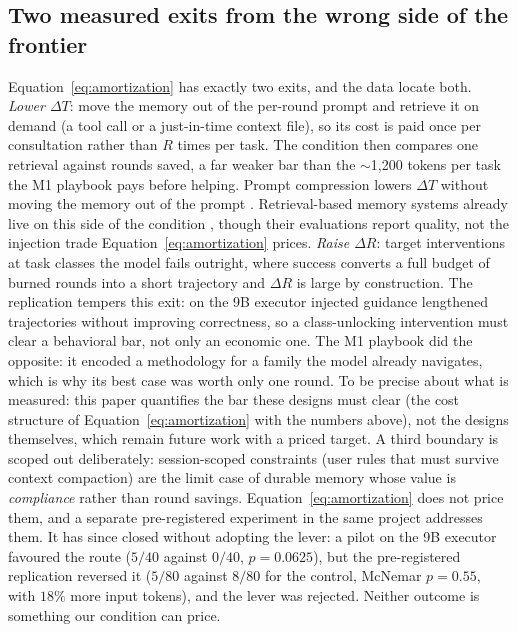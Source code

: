 \documentclass[smallcondensed,natbib]{svjour3}
\begin{document}
\subsection{Two measured exits from the wrong side of the
frontier}\label{sec:disc-directions}

Equation~\eqref{eq:amortization} has exactly two exits, and the data
locate both. \emph{Lower $\Delta T$}: move the memory out of the
per-round prompt and retrieve it on demand (a tool call or a
just-in-time context file), so its cost is paid once per consultation
rather than $R$ times per task. The condition then compares one
retrieval against rounds saved, a far weaker bar than the
$\sim$1{,}200 tokens per task the M1 playbook pays before helping.
Prompt compression lowers $\Delta T$ without moving the memory out of
the prompt \citep{jiang2023llmlingua,zhu2026babeltele}.
Retrieval-based memory systems already live on this side of the
condition \citep{park2023generativeagents,chhikara2025mem0}, though
their evaluations report quality, not the injection trade
Equation~\eqref{eq:amortization} prices.
\emph{Raise $\Delta R$}: target interventions at task classes the
model fails outright, where success converts a full budget of burned
rounds into a short trajectory and $\Delta R$ is large by
construction. The replication tempers this exit: on the 9B executor
injected guidance lengthened trajectories without improving
correctness, so a class-unlocking intervention must clear a behavioral
bar, not only an economic one.
The M1 playbook did the opposite: it encoded a
methodology for a family the model already navigates, which is why
its best case was worth only one round. To be precise about what is
measured: this paper quantifies the bar these designs must clear (the cost
structure of Equation~\eqref{eq:amortization} with the numbers
above), not the designs themselves, which remain future work with a
priced target. A third boundary is
scoped out deliberately: session-scoped constraints (user rules that
must survive context compaction) are the limit case of durable memory
whose value is \emph{compliance} rather than round savings.
Equation~\eqref{eq:amortization} does not price them, and a separate
pre-registered experiment in the same project addresses them. It has
since closed without adopting the lever: a pilot on the 9B executor
favoured the route ($5/40$ against $0/40$, $p=0.0625$), but the
pre-registered replication reversed it ($5/80$ against $8/80$ for the
control, McNemar $p=0.55$, with $18\%$ more input tokens), and the
lever was rejected. Neither outcome is something our condition can
price.
\end{document}
